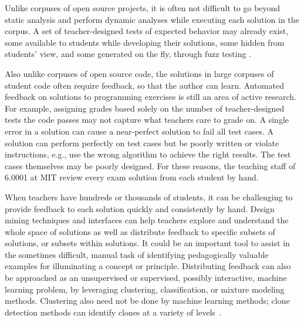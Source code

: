 Unlike corpuses of open source projects, it is often not difficult to go beyond static analysis and perform dynamic analyses while executing each solution in the corpus. A set of teacher-designed tests of expected behavior may already exist, some available to students while developing their solutions, some hidden from students' view, and some generated on the fly, through fuzz testing \cite{fuzztesting}. %

Also unlike corpuses of open source code, the solutions in large corpuses of student code often require feedback, so that the author can learn. Automated feedback on solutions to programming exercises is still an area of active research. For example, assigning grades based solely on the number of teacher-designed tests the code passes may not capture what teachers care to grade on. A single error in a solution can cause a near-perfect solution to fail all test cases. A solution can perform perfectly on test cases but be poorly written or violate instructions, e.g., use the wrong algorithm to achieve the right results. The test cases themselves may be poorly designed. For these reasons, the teaching staff of 6.0001 at MIT review every exam solution from each student by hand.

When teachers have hundreds or thousands of students, it can be challenging to provide feedback to each solution quickly and consistently by hand. Design mining techniques and interfaces can help teachers explore and understand the whole space of solutions as well as distribute feedback to specific subsets of solutions, or subsets within solutions. It could be an important tool to assist in the sometimes difficult, manual task of identifying pedagogically valuable examples for illuminating a concept or principle. Distributing feedback can also be approached as an unsupervised or supervised, possibly interactive, machine learning problem, by leveraging clustering, classification, or mixture modeling methods. Clustering also need not be done by machine learning methods; clone detection methods can identify clones at a variety of levels~\cite{roy2009comparison}.



